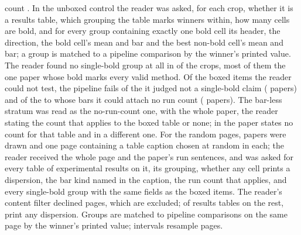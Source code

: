 \documentclass{article}
\begin{document}
count \nGoldFrozenRuns{}. In the
unboxed control the reader was asked, for each crop, whether it is a results
table, which grouping the table marks winners within, how many cells are
bold, and for every group containing exactly one bold cell its header, the
direction, the bold cell's mean and bar and the best non-bold cell's mean and
bar; a group is matched to a pipeline comparison by the winner's printed
value. The reader found no single-bold group at all in \nNoboxNoSingleBold{}
of the \nNoboxN{} crops, most of them the one paper whose bold marks every
valid method. Of the \nFrozenUntestableN{} boxed items the reader could not
test, the pipeline fails \nFrozenNotClaimPipeFails{} of the
\nFrozenNotClaimN{} it judged not a single-bold claim
(\nFrozenNotClaimPapers{} papers) and \nFrozenNoUsablePipeFails{} of the
\nFrozenNoUsableN{} to whose bars it could attach no run count
(\nFrozenNoUsablePapers{} papers). The bar-less stratum was read as the no-run-count one, with
the whole paper, the reader stating the count that applies to the boxed
table or none; in \nNobarNNoneFrac{} the paper states no count for that
table and in \nNobarNOtherFrac{} a different one. For the random pages,
\nPagesDrawn{} papers were drawn and one page containing a table caption
chosen at random in each; the reader received the whole page and the paper's
run sentences, and was asked for every table of experimental results on it,
its grouping, whether any cell prints a dispersion, the bar kind named in the
caption, the run count that applies, and every single-bold group with the
same fields as the boxed items. The reader's content filter declined
\nPagesUnread{} pages, which are excluded; of \nPagesTables{} results tables
on the rest, \nPagesTablesWithBar{} print any dispersion. Groups are matched
to pipeline comparisons on the same page by the winner's printed value;
intervals resample pages.
\end{document}
